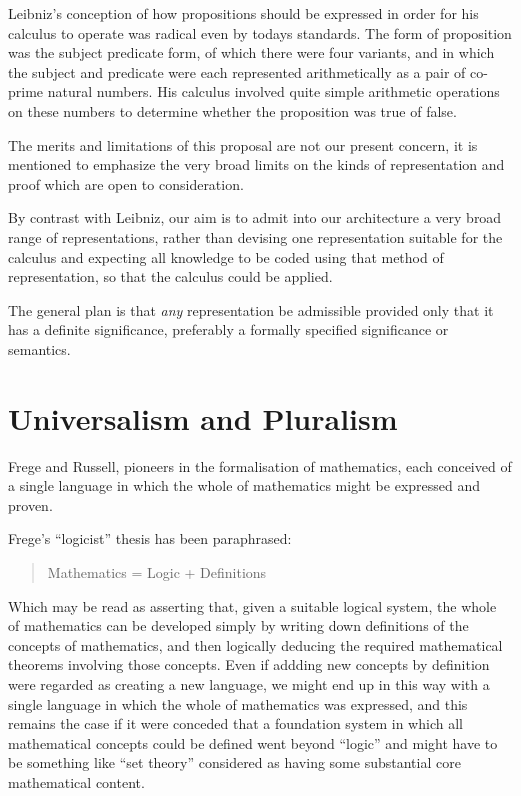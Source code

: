 Leibniz's conception of how propositions should be expressed in order
for his calculus to operate was radical even by todays standards.
The form of proposition was the subject predicate form, of which there
were four variants, and in which the subject and predicate were each
represented arithmetically as a pair of co-prime natural numbers.
His calculus involved quite simple arithmetic operations on these
numbers to determine whether the proposition was true of false.

The merits and limitations of this proposal are not our present
concern, it is mentioned to emphasize the very broad limits on
the kinds of representation and proof which are open to
consideration.

By contrast with Leibniz, our aim is to admit into our architecture a
very broad range of representations, rather than devising one
representation suitable for the calculus and expecting all knowledge
to be coded using that method of representation, so that the calculus
could be applied.

The general plan is that \emph{any} representation be admissible
provided only that it has a definite significance, preferably a
formally specified significance or semantics.

\section{Universalism and Pluralism}

Frege and Russell, pioneers in the formalisation of mathematics, each
conceived of a single language in which the whole of mathematics might
be expressed and proven.

Frege's ``logicist'' thesis has been paraphrased:

\begin{quote}
Mathematics = Logic + Definitions
\end{quote}

Which may be read as asserting that, given a suitable logical system,
the whole of mathematics can be developed simply by writing down
definitions of the concepts of mathematics, and then logically deducing
the required mathematical theorems involving those concepts.
Even if addding new concepts by definition were regarded as creating
a new language, we might end up in this way with a single language in
which the whole of mathematics was expressed, and this remains the case
if it were conceded that a foundation system in which all mathematical
concepts could be defined went beyond ``logic'' and might have to be
something like ``set theory'' considered as having some substantial
core mathematical content.

